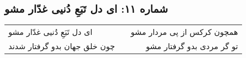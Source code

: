 \begin{center}
\section*{شماره ۱۱: ای دل تَبَعِ دُنیی غدّار مشو}
\label{sec:011}
\begin{longtable}{l p{0.5cm} r}
ای دل تَبَعِ دُنیی غدّار مشو
&&
همچون کرکس از پی مردار مشو
\\
چون خلق جهان بدو گرفتار شدند
&&
تو گر مردی بدو گرفتار مشو
\\
\end{longtable}
\end{center}
